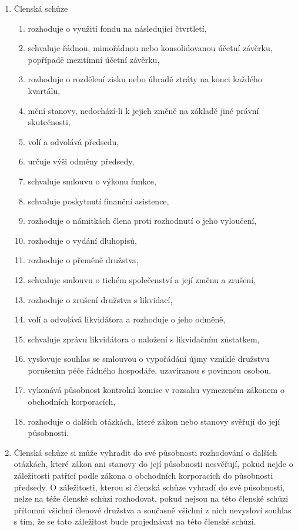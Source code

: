 \begin{enumerate}
    \item Členská schůze
    \begin{enumerate}[label=\alph*.]
        \item rozhoduje o využití fondu na následující čtvrtletí,
        \item schvaluje řádnou, mimořádnou nebo konsolidovanou účetní závěrku, popřípadě mezitímní účetní závěrku,
        \item rozhoduje o rozdělení zisku nebo úhradě ztráty na konci každého kvartálu,
        \item mění stanovy, nedochází-li k jejich změně na základě jiné právní skutečnosti,
        \item volí a odvolává předsedu,
        \item určuje výši odměny předsedy,
        \item schvaluje smlouvu o výkonu funkce,
        \item schvaluje poskytnutí finanční asistence,
        \item rozhoduje o námitkách člena proti rozhodnutí o jeho vyloučení,
        \item rozhoduje o vydání dluhopisů,
        \item rozhoduje o přeměně družstva,
        \item schvaluje smlouvu o tichém společenství a její změnu a zrušení,
        \item rozhoduje o zrušení družstva s likvidací,
        \item volí a odvolává likvidátora a rozhoduje o jeho odměně,
        \item schvaluje zprávu likvidátora o naložení s likvidačním zůstatkem,
        \item vyslovuje souhlas se smlouvou o vypořádání újmy vzniklé družstvu porušením péče řádného hospodáře, uzavíranou s povinnou osobou,
        \item vykonává působnost kontrolní komise v rozsahu vymezeném zákonem o obchodních korporacích,
        \item rozhoduje o dalších otázkách, které zákon nebo stanovy svěřují do její působnosti.
    \end{enumerate}
    \item Členská schůze si může vyhradit do své působnosti rozhodování o dalších otázkách, které zákon ani stanovy do její působnosti nesvěřují, pokud nejde o záležitosti patřící podle zákona o obchodních korporacích do působnosti předsedy. O záležitosti, kterou si členská schůze vyhradí do své působnosti, nelze na téže členské schůzi rozhodovat, pokud nejsou na této členské schůzi přítomni všichni členové družstva a současně všichni z nich nevysloví souhlas s tím, že se tato záležitost bude projednávat na této členské schůzi.
\end{enumerate}

